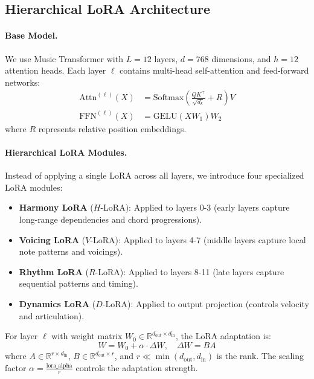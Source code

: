 \documentclass{article}
\newcommand{\R}{\mathbb{R}}
\begin{document}
\subsection{Hierarchical LoRA Architecture}

\paragraph{Base Model.}
We use Music Transformer \cite{huang2018music} with $L=12$ layers, $d=768$ dimensions, and $h=12$ attention heads. Each layer $\ell$ contains multi-head self-attention and feed-forward networks:
\begin{align}
    \text{Attn}^{(\ell)}(X) &= \text{Softmax}\left(\frac{QK^\top}{\sqrt{d_k}} + R\right)V \\
    \text{FFN}^{(\ell)}(X) &= \text{GELU}(XW_1)W_2
\end{align}
where $R$ represents relative position embeddings.

\paragraph{Hierarchical LoRA Modules.}
Instead of applying a single LoRA across all layers, we introduce four specialized LoRA modules:

\begin{itemize}
    \item \textbf{Harmony LoRA} ($H$-LoRA): Applied to layers 0-3 (early layers capture long-range dependencies and chord progressions).

    \item \textbf{Voicing LoRA} ($V$-LoRA): Applied to layers 4-7 (middle layers capture local note patterns and voicings).

    \item \textbf{Rhythm LoRA} ($R$-LoRA): Applied to layers 8-11 (late layers capture sequential patterns and timing).

    \item \textbf{Dynamics LoRA} ($D$-LoRA): Applied to output projection (controls velocity and articulation).
\end{itemize}

For layer $\ell$ with weight matrix $W_0 \in \R^{d_{\text{out}} \times d_{\text{in}}}$, the LoRA adaptation is:
\begin{equation}
    W = W_0 + \alpha \cdot \Delta W, \quad \Delta W = BA
\end{equation}
where $A \in \R^{r \times d_{\text{in}}}$, $B \in \R^{d_{\text{out}} \times r}$, and $r \ll \min(d_{\text{out}}, d_{\text{in}})$ is the rank. The scaling factor $\alpha = \frac{\text{lora\_alpha}}{r}$ controls the adaptation strength.
\end{document}
